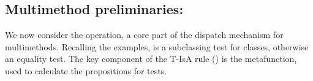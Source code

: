 %
%

\subsection{Multimethod preliminaries: \isaliteral}

\label{sec:isaformal}

We now consider the \isaliteral{} operation, a core part of the dispatch mechanism for multimethods. 
Recalling the  examples,
\isaliteral{} is
a subclassing test for classes, otherwise an equality test.
%
The key component of the T-IsA rule ()
is the \isacompareliteral{} 
metafunction, used to calculate the propositions for
\isaliteral{} tests.

